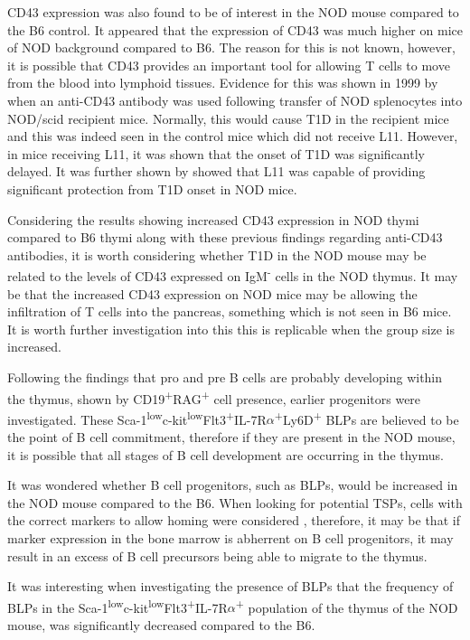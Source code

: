 CD43 expression was also found to be of interest in the NOD mouse compared to the B6 control.
It appeared that the expression of CD43 was much higher on mice of NOD background compared to B6.
The reason for this is not known, however, it is possible that CD43 provides an important tool for allowing T cells to move from the blood into lymphoid tissues.
Evidence for this was shown in 1999 by \citet{Mikulowska1999} when an anti-CD43 antibody was used following transfer of NOD splenocytes into NOD/scid recipient mice. 
Normally, this would cause T1D in the recipient mice and this was indeed seen in the control mice which did not receive L11.
However, in mice receiving L11, it was shown that the onset of T1D was significantly delayed.
It was further shown by \citet{Johnson1999} showed that L11 was capable of providing significant protection from T1D onset in NOD mice.

Considering the results showing increased CD43 expression in NOD thymi compared to B6 thymi along with these previous findings regarding anti-CD43 antibodies, it is worth considering whether T1D in the NOD mouse may be related to the levels of CD43 expressed on IgM\textsuperscript{-} cells in the NOD thymus.
It may be that the increased CD43 expression on NOD mice may be allowing the infiltration of T cells into the pancreas, something which is not seen in B6 mice.
It is worth further investigation into this this is replicable when the group size is increased.


Following the findings that pro and pre B cells are probably developing within the thymus, shown by CD19\textsuperscript{+}RAG\textsuperscript{+} cell presence, earlier progenitors were investigated.
These Sca-1\textsuperscript{low}c-kit\textsuperscript{low}Flt3\textsuperscript{+}IL-7R$\alpha$\textsuperscript{+}Ly6D\textsuperscript{+} BLPs are believed to be the point of B cell commitment, therefore if they are present in the NOD mouse, it is possible that all stages of B cell development are occurring in the thymus.

It was wondered whether B cell progenitors, such as BLPs, would be increased in the NOD mouse compared to the B6.
When looking for potential TSPs, cells with the correct markers to allow homing were considered \citep{Zlotoff2011}, therefore, it may be that if marker expression in the bone marrow is abherrent on B cell progenitors, it may result in an excess of B cell precursors being able to migrate to the thymus.

It was interesting when investigating the presence of BLPs that the frequency of BLPs in the Sca-1\textsuperscript{low}c-kit\textsuperscript{low}Flt3\textsuperscript{+}IL-7R$\alpha$\textsuperscript{+} population of the thymus of the NOD mouse, was significantly decreased compared to the B6.

